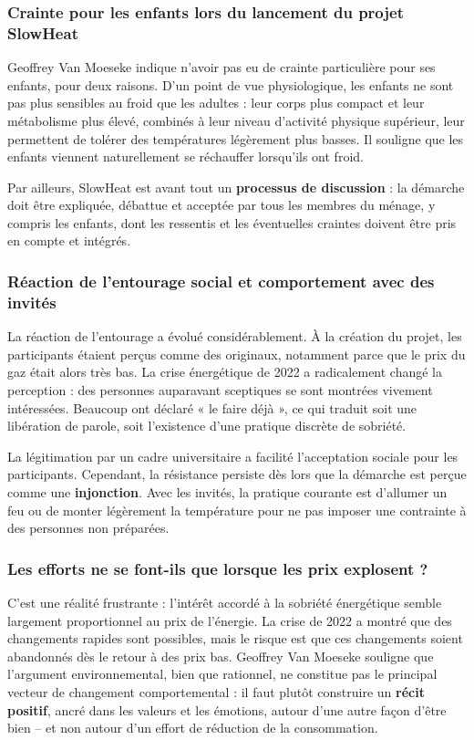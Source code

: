\subsubsection{Crainte pour les enfants lors du lancement du projet SlowHeat}

Geoffrey Van Moeseke indique n'avoir pas eu de crainte particulière pour ses enfants, pour deux raisons. D'un point de vue physiologique, les enfants ne sont pas plus sensibles au froid que les adultes : leur corps plus compact et leur métabolisme plus élevé, combinés à leur niveau d'activité physique supérieur, leur permettent de tolérer des températures légèrement plus basses. Il souligne que les enfants viennent naturellement se réchauffer lorsqu'ils ont froid.

Par ailleurs, SlowHeat est avant tout un \textbf{processus de discussion} : la démarche doit être expliquée, débattue et acceptée par tous les membres du ménage, y compris les enfants, dont les ressentis et les éventuelles craintes doivent être pris en compte et intégrés.

\subsubsection{Réaction de l'entourage social et comportement avec des invités}

La réaction de l'entourage a évolué considérablement. À la création du projet, les participants étaient perçus comme des originaux, notamment parce que le prix du gaz était alors très bas. La crise énergétique de 2022 a radicalement changé la perception : des personnes auparavant sceptiques se sont montrées vivement intéressées. Beaucoup ont déclaré « le faire déjà », ce qui traduit soit une libération de parole, soit l'existence d'une pratique discrète de sobriété.

La légitimation par un cadre universitaire a facilité l'acceptation sociale pour les participants. Cependant, la résistance persiste dès lors que la démarche est perçue comme une \textbf{injonction}. Avec les invités, la pratique courante est d'allumer un feu ou de monter légèrement la température pour ne pas imposer une contrainte à des personnes non préparées.

\subsubsection{Les efforts ne se font-ils que lorsque les prix explosent ?}

C'est une réalité frustrante : l'intérêt accordé à la sobriété énergétique semble largement proportionnel au prix de l'énergie. La crise de 2022 a montré que des changements rapides sont possibles, mais le risque est que ces changements soient abandonnés dès le retour à des prix bas. Geoffrey Van Moeseke souligne que l'argument environnemental, bien que rationnel, ne constitue pas le principal vecteur de changement comportemental : il faut plutôt construire un \textbf{récit positif}, ancré dans les valeurs et les émotions, autour d'une autre façon d'être bien -- et non autour d'un effort de réduction de la consommation.

